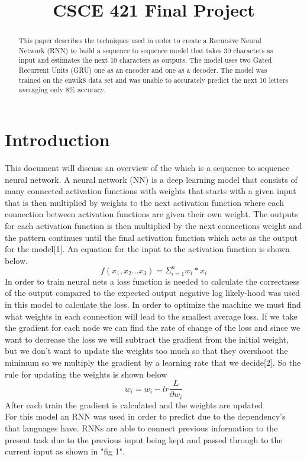 \documentclass[conference]{IEEEtran}
\begin{document}
\title{CSCE 421 Final Project\\
}

\author{

}

\maketitle

\begin{abstract}
This paper describes the techniques used in order to create a Recursive Neural Network (RNN) to build a sequence to sequence model that takes 30 characters as input and estimates the next 10 characters as outputs. The model uses two Gated Recurrent Units (GRU) one as an encoder and one as a decoder. The model was trained on the enwik8 data set and was unable to accurately predict the next 10 letters averaging only 8\% accuracy.
\end{abstract}


\section{Introduction}
This document will discuss an overview of the which is a sequence to sequence neural network. A neural network (NN) is a deep learning model that consists of many connected activation functions with weights that starts with a given input that is then multiplied by weights to the next activation function where each connection between activation functions are given their own weight. The outputs for each activation function is then multiplied by the next connections weight and the pattern continues until the final activation function which acts as the output for the model[1]. An equation for the input to the activation function is shown below.
$$ f(x_1, x_2 ... x_3) = \Sigma_{i=1}^{n} w_i * x_i $$
\>In order to train neural nets a loss function is needed to calculate the correctness of the output compared to the expected output negative log likely-hood was used in this model to calculate the loss. In order to optimize the machine we must find what weights in each connection will lead to the smallest average loss. If we take the gradient for each node we can find the rate of change of the loss and since we want to decrease the loss we will subtract the gradient from the initial weight, but we don't want to update the weights too much so that they overshoot the minimum so we multiply the gradient by a learning rate that we decide[2]. So the rule for updating the weights is shown below
$$ w_i = w_i- lr\frac{L}{\partial w_i}$$
After each train the gradient is calculated and the weights are updated\\
For this model an RNN was used in order to predict due to the dependency's that languages have. RNNs are able to connect previous information to the present task due to the previous input being kept and passed through to the current input as shown in "fig 1".
\end{document}
